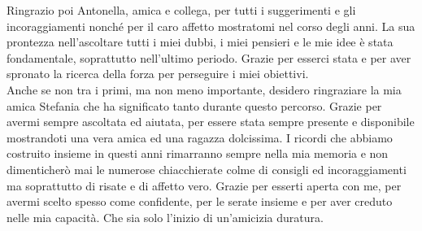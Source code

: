 \documentclass[12pt,a4paper,oneside]{book}
\begin{document}
Ringrazio poi Antonella, amica e collega, per tutti i suggerimenti e gli incoraggiamenti nonché per il caro affetto mostratomi nel corso degli anni. La sua prontezza nell'ascoltare tutti i miei dubbi, i miei pensieri e le mie idee è stata fondamentale, soprattutto nell'ultimo periodo. Grazie per esserci stata e per aver spronato la ricerca della forza per perseguire i miei obiettivi.\\
Anche se non tra i primi, ma non meno importante, desidero ringraziare la mia amica Stefania che ha significato tanto durante questo percorso. Grazie per avermi sempre ascoltata ed aiutata, per essere stata sempre presente e disponibile mostrandoti una vera amica ed una ragazza dolcissima. I ricordi che abbiamo costruito insieme in questi anni rimarranno sempre nella mia memoria e non dimenticherò mai le numerose chiacchierate colme di consigli ed incoraggiamenti ma soprattutto di risate e di affetto vero. Grazie per esserti aperta con me, per avermi scelto spesso come confidente, per le serate insieme e per aver creduto nelle mia capacità. Che sia solo l'inizio di un'amicizia duratura.
\end{document}
